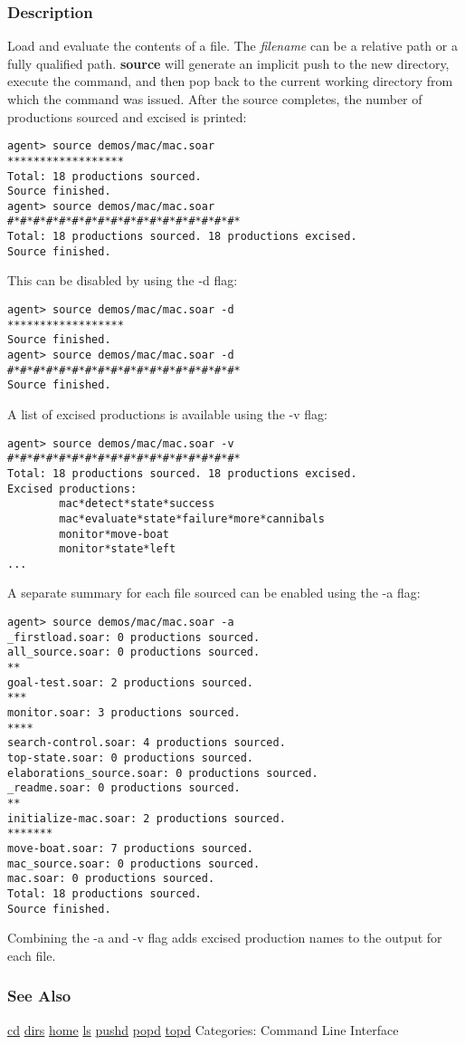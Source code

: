\subsubsection*{Description}
 Load and evaluate the contents of a file. The \emph{filename}
 can be a relative path or a fully qualified path. \textbf{source}
 will generate an implicit push to the new directory, execute the command, and then pop back to the current working directory from which the command was issued. 
 After the source completes, the number of productions sourced and excised is printed: \begin{verbatim}
agent> source demos/mac/mac.soar
******************
Total: 18 productions sourced.
Source finished.
agent> source demos/mac/mac.soar
#*#*#*#*#*#*#*#*#*#*#*#*#*#*#*#*#*#*
Total: 18 productions sourced. 18 productions excised.
Source finished.
\end{verbatim}
 This can be disabled by using the -d flag: \begin{verbatim}
agent> source demos/mac/mac.soar -d
******************
Source finished.
agent> source demos/mac/mac.soar -d
#*#*#*#*#*#*#*#*#*#*#*#*#*#*#*#*#*#*
Source finished.
\end{verbatim}
 A list of excised productions is available using the -v flag: \begin{verbatim}
agent> source demos/mac/mac.soar -v
#*#*#*#*#*#*#*#*#*#*#*#*#*#*#*#*#*#*
Total: 18 productions sourced. 18 productions excised.
Excised productions:
        mac*detect*state*success
        mac*evaluate*state*failure*more*cannibals
        monitor*move-boat
        monitor*state*left
...
\end{verbatim}
 A separate summary for each file sourced can be enabled using the -a flag: \begin{verbatim}
agent> source demos/mac/mac.soar -a
_firstload.soar: 0 productions sourced.
all_source.soar: 0 productions sourced.
**
goal-test.soar: 2 productions sourced.
***
monitor.soar: 3 productions sourced.
****
search-control.soar: 4 productions sourced.
top-state.soar: 0 productions sourced.
elaborations_source.soar: 0 productions sourced.
_readme.soar: 0 productions sourced.
**
initialize-mac.soar: 2 productions sourced.
*******
move-boat.soar: 7 productions sourced.
mac_source.soar: 0 productions sourced.
mac.soar: 0 productions sourced.
Total: 18 productions sourced.
Source finished.
\end{verbatim}
 Combining the -a and -v flag adds excised production names to the output for each file. 
\subsubsection*{See Also}
\hyperref[cd]{cd} \hyperref[dirs]{dirs} \hyperref[home]{home} \hyperref[ls]{ls} \hyperref[pushd]{pushd} \hyperref[popd]{popd} \hyperref[topd]{topd}  Categories: Command Line Interface
